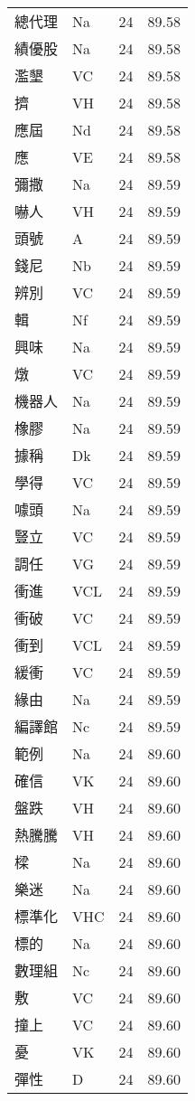 \documentclass[twocolumn]{book}
\begin{document}
\begin{supertabular}{llrr}
總代理 & Na & 24 &  89.58\\
績優股 & Na & 24 &  89.58\\
濫墾 & VC & 24 &  89.58\\
擠 & VH & 24 &  89.58\\
應屆 & Nd & 24 &  89.58\\
應 & VE & 24 &  89.58\\
彌撒 & Na & 24 &  89.59\\
嚇人 & VH & 24 &  89.59\\
頭號 & A & 24 &  89.59\\
錢尼 & Nb & 24 &  89.59\\
辨別 & VC & 24 &  89.59\\
輯 & Nf & 24 &  89.59\\
興味 & Na & 24 &  89.59\\
燉 & VC & 24 &  89.59\\
機器人 & Na & 24 &  89.59\\
橡膠 & Na & 24 &  89.59\\
據稱 & Dk & 24 &  89.59\\
學得 & VC & 24 &  89.59\\
噱頭 & Na & 24 &  89.59\\
豎立 & VC & 24 &  89.59\\
調任 & VG & 24 &  89.59\\
衝進 & VCL & 24 &  89.59\\
衝破 & VC & 24 &  89.59\\
衝到 & VCL & 24 &  89.59\\
緩衝 & VC & 24 &  89.59\\
緣由 & Na & 24 &  89.59\\
編譯館 & Nc & 24 &  89.59\\
範例 & Na & 24 &  89.60\\
確信 & VK & 24 &  89.60\\
盤跌 & VH & 24 &  89.60\\
熱騰騰 & VH & 24 &  89.60\\
樑 & Na & 24 &  89.60\\
樂迷 & Na & 24 &  89.60\\
標準化 & VHC & 24 &  89.60\\
標的 & Na & 24 &  89.60\\
數理組 & Nc & 24 &  89.60\\
敷 & VC & 24 &  89.60\\
撞上 & VC & 24 &  89.60\\
憂 & VK & 24 &  89.60\\
彈性 & D & 24 &  89.60\\

\end{supertabular}
\end{document}

